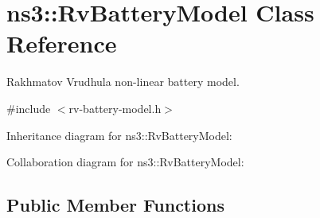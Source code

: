 \hypertarget{classns3_1_1RvBatteryModel}{}\section{ns3\+:\+:Rv\+Battery\+Model Class Reference}
\label{classns3_1_1RvBatteryModel}


Rakhmatov Vrudhula non-\/linear battery model.  




{\ttfamily \#include $<$rv-\/battery-\/model.\+h$>$}



Inheritance diagram for ns3\+:\+:Rv\+Battery\+Model\+:


Collaboration diagram for ns3\+:\+:Rv\+Battery\+Model\+:
\subsection*{Public Member Functions}
